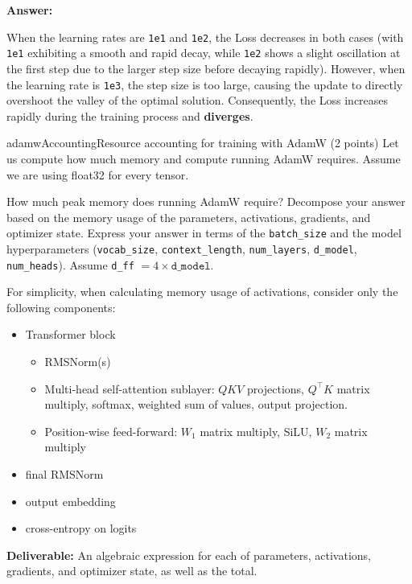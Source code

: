 \begin{answerbox}
    \textbf{Answer:}

    When the learning rates are \texttt{1e1} and \texttt{1e2}, the Loss decreases in both cases (with \texttt{1e1} exhibiting a smooth and rapid decay, while \texttt{1e2} shows a slight oscillation at the first step due to the larger step size before decaying rapidly). However, when the learning rate is \texttt{1e3}, the step size is too large, causing the update to directly overshoot the valley of the optimal solution. Consequently, the Loss increases rapidly during the training process and \textbf{diverges}.
\end{answerbox}

\boxseparator

\begin{problembox}{adamwAccounting}{Resource accounting for training with AdamW \hfill (2 points)}
    Let us compute how much memory and compute running AdamW requires. Assume we are using float32 for every tensor.
\end{problembox}

\begin{questionbox}
    How much peak memory does running AdamW require? Decompose your answer based on the memory usage of the parameters, activations, gradients, and optimizer state. Express your answer in terms of the \texttt{batch\_size} and the model hyperparameters (\texttt{vocab\_size}, \texttt{context\_length}, \texttt{num\_layers}, \texttt{d\_model}, \texttt{num\_heads}). Assume \texttt{d\_ff} $= 4 \times \texttt{d\_model}$.

    For simplicity, when calculating memory usage of activations, consider only the following components:
    \begin{itemize}
        \item Transformer block
              \begin{itemize}
                  \item RMSNorm(s)
                  \item Multi-head self-attention sublayer: $QKV$ projections, $Q^\top K$ matrix multiply, softmax, weighted sum of values, output projection.
                  \item Position-wise feed-forward: $W_1$ matrix multiply, SiLU, $W_2$ matrix multiply
              \end{itemize}
        \item final RMSNorm
        \item output embedding
        \item cross-entropy on logits
    \end{itemize}

    \textbf{Deliverable:} An algebraic expression for each of parameters, activations, gradients, and optimizer state, as well as the total.
\end{questionbox}

